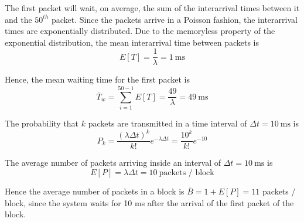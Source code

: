 The first packet will wait, on average, the sum of the interarrival times between
it and the $50^{th}$ packet. Since the packets arrive in a Poisson fashion, the
interarrival times are exponentially distributed. Due to the memoryless property
of the exponential distribution, the mean interarrival time between packets is
$$E[T] = \dfrac{1}{\lambda} = 1\ \text{ms}$$

Hence, the mean waiting time for the first packet is
$$\overline{T}_w = \sum_{i=1}^{50-1} E[T] = \dfrac{49}{\lambda} = 49\ \text{ms}$$

The probability that $k$ packets are transmitted in a time interval of
$\Delta t = 10\ \text{ms}$ is
$$P_k = \dfrac{(\lambda \Delta t)^k}{k!}e^{-\lambda \Delta t} = \dfrac{10^k}{k!}e^{-10}$$

The average number of packets arriving inside an interval of
$\Delta t = 10\ \text{ms}$ is
$$E[P] = \lambda \Delta t = 10\ \text{packets / block}$$

Hence the average number of packets in a block is $\overline{B} = 1 + E[P] = 11$ packets / block,
since the system waits for 10 ms after the arrival of the first packet of the block.
